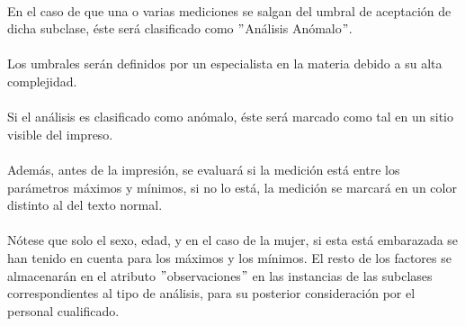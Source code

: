 \documentclass[a4paper,10pt]{article}
\begin{document}
\paragraph{}
En el caso de que una o varias mediciones se salgan del umbral de aceptación de dicha subclase, éste será clasificado como $"$Análisis Anómalo$"$.
\paragraph{}
Los umbrales serán definidos por un especialista en la materia debido a su alta complejidad.
\paragraph{}
Si el análisis es clasificado como anómalo, éste será marcado como tal en un sitio visible del impreso.
\paragraph{}
Además, antes de la impresión, se evaluará si la medición está entre los parámetros máximos y mínimos, si no lo está, la medición se marcará en un color distinto al del texto normal.
\paragraph{}
Nótese que solo el sexo, edad, y en el caso de la mujer, si esta está embarazada se han tenido en cuenta para los máximos y los mínimos. El resto de los factores se almacenarán en el atributo $"$observaciones$"$ en las instancias de las subclases correspondientes al tipo de análisis, para su posterior consideración por el personal cualificado.
\pagebreak
\end{document}

